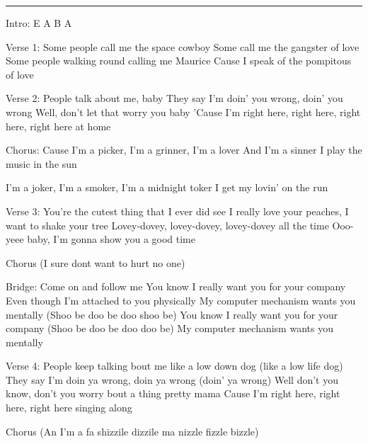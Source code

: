 \noindent\rule{\columnwidth}{1pt}

\begin{multicols}{2}
\begin{lstsong}
Intro: E A B A

Verse 1:
Some people call me the space cowboy
Some call me the gangster of love
Some people walking round calling me Maurice
Cause I speak of the pompitous of love

Verse 2:
People talk about me, baby
They say I'm doin' you wrong, doin' you wrong
Well, don't let that worry you baby
'Cause I'm right here, right here, right here,
right here at home

Chorus:
Cause I'm a picker,
I'm a grinner,
I'm a lover
And I'm a sinner
I play the music in the sun

I'm a joker,
I'm a smoker,
I'm a midnight toker
I get my lovin' on the run





Verse 3:
You're the cutest thing that I ever did see
I really love your peaches, I want to shake your tree
Lovey-dovey, lovey-dovey, lovey-dovey all the time
Ooo-yeee baby, I'm gonna show you a good time

Chorus
(I sure dont want to hurt no one)

Bridge:
Come on and follow me
You know I really want you for your company
Even though I'm attached to you physically
My computer mechanism wants you mentally
(Shoo be doo be doo shoo be)
You know I really want you for your company
(Shoo be doo be doo doo be)
My computer mechanism wants you mentally

Verse 4:
People keep talking bout me like a low down dog 
(like a low life dog)
They say I'm doin ya wrong, doin ya wrong
(doin' ya wrong)
Well don't you know, don't you worry 
  bout a thing pretty mama
Cause I'm right here, right here, 
right here singing along

Chorus
(An I'm a fa shizzile dizzile ma nizzle fizzle bizzle)
\end{lstsong}
\end{multicols}
\newpage


